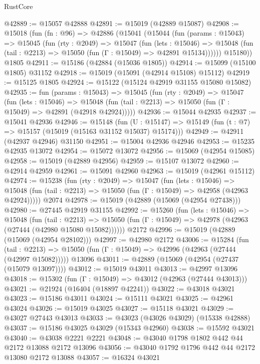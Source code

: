 \begin{lexlean}{RustCore}
\begin{coremodule}
@42889 := @15057 @42888
@42891 := @15019 (@42889 @15087)
@42908 := @15018
    (fun (fn : @96) =>
    @42886
      (@15041
        (@15044
          (fun (params : @15043) =>
          @15045
            (fun (rty : @2049) =>
            @15047
              (fun (lets : @15046) =>
              @15048 (fun (tail : @2213) => @15050 (fun (Γ : @15049) => @42891 @15134))))))
        @15180))
    @1805
@42911 := @15186 (@42884 (@15036 @1805))
@42914 := @15099 (@15100 @1805) @31152
@42918 := @15019 (@15091 (@42914 @15108) @15112)
@42919 := @15125 @1805
@42924 := @15122 (@15124 @42919 @31155 @15080 @15082)
@42935 := fun (params : @15043) =>
  @15045
    (fun (rty : @2049) =>
    @15047
      (fun (lets : @15046) =>
      @15048 (fun (tail : @2213) => @15050 (fun (Γ : @15049) => @42891 (@42918 @42924)))))
@42936 := @15044 @42935
@42937 := @15041 @42936
@42946 := @15148
    (fun (U : @15147) => @15149 (fun (t : @7) => @15157 (@15019 (@15163 @31152 @15037) @15174)))
@42949 := @42911 (@42937 @42946) @31150
@42951 := @15004 @42936 @42946
@42953 := @15235 @42935 @13072
@42954 := @15072 @13072
@42956 := @15069 (@42954 @15085)
@42958 := @15019 (@42889 @42956)
@42959 := @15107 @13072
@42960 := @42914 @42959
@42961 := @15091 @42960
@42963 := @15019 (@42961 @15112)
@42974 := @15238
    (fun (rty : @2049) =>
    @15047
      (fun (lets : @15046) =>
      @15048 (fun (tail : @2213) => @15050 (fun (Γ : @15049) => @42958 (@42963 @42924)))))
    @2074
@42978 := @15019 (@42889 (@15069 (@42954 @27438)))
@42980 := @27445 @42919 @31155
@42992 := @15260
    (fun (lets : @15046) =>
    @15048
      (fun (tail : @2213) =>
      @15050 (fun (Γ : @15049) => @42978 (@42963 (@27444 (@42980 @15080 @15082))))))
    @2172
@42996 := @15019 (@42889 (@15069 (@42954 @28102)))
@42997 := @42980 @2172
@43006 := @15284
    (fun (tail : @2213) => @15050 (fun (Γ : @15049) => @42996 (@42963 (@27444 (@42997 @15082)))))
    @13096
@43011 := @42889 (@15069 (@42954 (@27437 (@15079 @13097))))
@43012 := @15019 @43011
@43013 := @42997 @13096
@43018 := @15302 (fun (Γ : @15049) => @43012 (@42963 (@27444 @43013)))
@43021 := @21924 (@16404 (@18897 @42241))
@43022 := @43018 @43021
@43023 := @15186 @43011
@43024 := @15111 @43021
@43025 := @42961 @43024
@43026 := @15019 @43025
@43027 := @15118 @43021
@43029 := @43027 @27443 @43013
@43033 := @43023 (@43026 @43029) (@15338 @42888)
@43037 := @15186 @43025 @43029 (@15343 @42960)
@43038 := @15592 @43021
@43040 := @43038 @2221 @2221
@43048 := @43040 @1798 @1802 @442 @44 @2172 @13088 @2172 @13096
@43056 := @43040 @1792 @1796 @442 @44 @2172 @13080 @2172 @13088
@43057 := @16324 @43021

\end{coremodule}
\end{lexlean}
